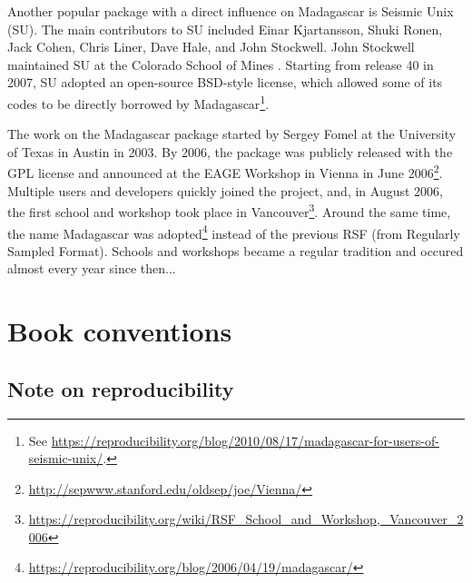 Another popular package with a direct influence on Madagascar is
Seismic Unix (SU). The main contributors to SU included Einar
Kjartansson, Shuki Ronen, Jack Cohen, Chris Liner, Dave Hale, and John
Stockwell. John Stockwell maintained SU at the Colorado School of
Mines \cite[]{stockwell1997free}. Starting from release 40 in 2007, SU
adopted an open-source BSD-style license, which allowed some of its
codes to be directly borrowed by Madagascar\footnote{See
  \url{https://reproducibility.org/blog/2010/08/17/madagascar-for-users-of-seismic-unix/}.}.

The work on the Madagascar package started by Sergey Fomel at the
University of Texas in Austin in 2003. By 2006, the package was
publicly released with the GPL license and announced at the EAGE
Workshop in Vienna in June
2006\footnote{\url{http://sepwww.stanford.edu/oldsep/joe/Vienna/}}. Multiple
users and developers quickly joined the project, and, in August 2006,
the first school and workshop took place in
Vancouver{\footnote{\url{https://reproducibility.org/wiki/RSF_School_and_Workshop,_Vancouver_2006}}}. Around
the same time, the name Madagascar was
adopted\footnote{\url{https://reproducibility.org/blog/2006/04/19/madagascar/}}
instead of the previous RSF (from Regularly Sampled Format). Schools
and workshops became a regular tradition and occured almost every year
since then...

\section{Book conventions}

\subsection{Note on reproducibility}




